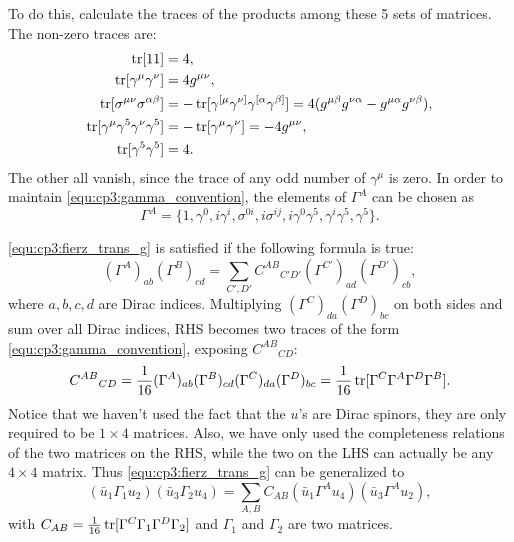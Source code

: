 \solution
\begin{problembody}
    \item To do this, calculate the traces of the products among these 5 sets of matrices. The non-zero traces are:
    \begin{align*}
        \operatorname{tr}[1 1] & = 4,\\
        \operatorname{tr}[\gamma^\mu\gamma^\nu] & = 4g^{\mu\nu},\\
        \operatorname{tr}[\sigma^{\mu\nu}\sigma^{\alpha\beta}] 
        & = -\operatorname{tr}[\gamma^{[\mu}\gamma^{\nu]}\gamma^{[\alpha}\gamma^{\beta]}]
        = 4(g^{\mu\beta}g^{\nu\alpha} - g^{\mu\alpha}g^{\nu\beta}),\\
        \operatorname{tr}[\gamma^\mu\gamma^5\gamma^\nu\gamma^5] 
        & = -\operatorname{tr}[\gamma^\mu\gamma^\nu]
        = -4g^{\mu\nu},\\
        \operatorname{tr}[\gamma^5\gamma^5] & = 4.
    \end{align*}
    The other all vanish, since the trace of any odd number of $\gamma^\mu$ is zero. 
    In order to maintain \eqref{equ:cp3:gamma_convention}, the elements of $\Gamma^A$ can be chosen as
    \begin{equation*}
        \Gamma^A = \{
            1, \gamma^0, i\gamma^i, \sigma^{0i}, i\sigma^{ij}, 
            i\gamma^0\gamma^5, \gamma^i\gamma^5, \gamma^5
        \}.
    \end{equation*}

    \item \eqref{equ:cp3:fierz_trans_g} is satisfied if the following formula is true:
    \begin{equation*}
        (\Gamma^A)_{ab}(\Gamma^B)_{cd}
        = \sum_{C', D'} C^{AB}{}_{C'D'}(\Gamma^{C'})_{ad}(\Gamma^{D'})_{cb},
    \end{equation*}
    where $a, b, c, d$ are Dirac indices.
    Multiplying $(\Gamma^C)_{da}(\Gamma^D)_{bc}$ on both sides and sum over all Dirac indices, RHS becomes two
    traces of the form \eqref{equ:cp3:gamma_convention}, exposing $C^{AB}{}_{CD}$:
    \begin{equation*}
        C^{AB}{}_{CD} = \frac{1}{16}(\Gamma^A)_{ab}(\Gamma^B)_{cd}(\Gamma^C)_{da}(\Gamma^D)_{bc}
        = \frac{1}{16}\operatorname{tr}[\Gamma^C\Gamma^A\Gamma^D\Gamma^B].
    \end{equation*}
    Notice that we haven't used the fact that the $u$'s are Dirac spinors, they are only required to be $1\times 4$ matrices.
    Also, we have only used the completeness relations of the two matrices on the RHS, while the two on the LHS can actually
    be any $4\times 4$ matrix. Thus \eqref{equ:cp3:fierz_trans_g} can be generalized to
    \begin{equation}\label{equ:cp3:fierz_trans_2}
        (\bar{u}_1 \Gamma_1 u_2)(\bar{u}_3 \Gamma_2 u_4) =
        \sum_{A, B} C_{AB} (\bar{u}_1\Gamma^Au_4)(\bar{u}_3\Gamma^Au_2),
    \end{equation}
    with $C_{AB} = \frac{1}{16}\operatorname{tr}[\Gamma^C\Gamma_1\Gamma^D\Gamma_2]$ and $\Gamma_1$ and $\Gamma_2$ are two matrices.


\end{problembody}
